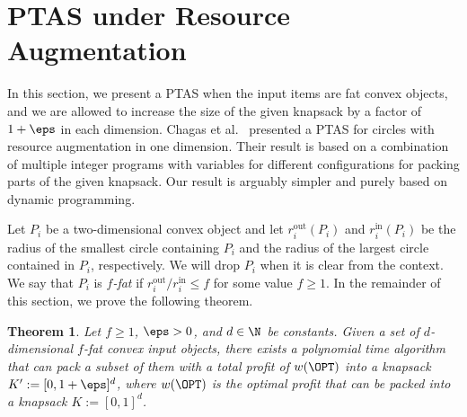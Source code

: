 \documentclass[10pt,a4paper]{article}
\newtheorem{theorem}{Theorem}[section]
\theoremstyle{plain}
\theoremstyle{plain}
\theoremstyle{plain}
\theoremstyle{definition}
\newcommand{\arir}[1]{}
\newcommand{\ari}[1]{#1}
\newcommand{\ag}[1]{#1}
\begin{document}
\section{\textsf{PTAS} under Resource Augmentation}
\label{sec:ptas-ra}
In this section, we present a \textsf{PTAS} when the input items are fat convex objects, and we are allowed to increase the size of the given knapsack by a factor of $1+\eps$ in each dimension. Chagas et al.~\cite{MiyazawaWAOA} presented a \textsf{PTAS} for circles with resource augmentation in one dimension. Their result is based on a combination of multiple integer programs with variables for different configurations for packing parts of the given knapsack.
Our result is arguably simpler and purely based on dynamic programming.


Let $P_i$ be a two-dimensional convex object and let $r_{i}^{\mathrm{out}}(P_i)$ and $r_{i}^{\mathrm{in}}(P_i)$ be
the radius of the smallest circle containing $P_{i}$ and the radius
of the largest circle contained in $P_i$, respectively. 
We will drop $P_i$ when it is clear from the context. 
We say that $P_i$ is $f$\emph{-fat} if  $r_{i}^{\mathrm{out}}/r_{i}^{\mathrm{in}}\le f$
for some value $f \ge 1$. In the remainder of this section, we prove the following theorem.


\begin{theorem}
	\label{thm:fat-ra}
	Let \ari{$f\ge 1$}, $\eps>0$, and $d\in \N$ be constants. Given a set of $d$-dimensional $f$-fat convex input objects, there exists a polynomial time algorithm that can pack a subset of them with a total profit of \ag{$w(\OPT)$} into a knapsack $K':=[0, 1+\eps]^d$, where \ag{$w(\OPT)$} is the optimal profit that can be packed into a knapsack $K:=[0, 1]^d$.
\end{theorem}

\arir{OPT is value or set}
\end{document}
